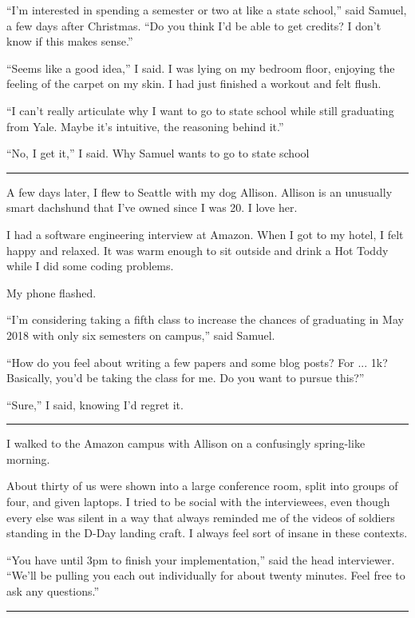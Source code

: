 ``I'm interested in spending a semester or two at like a state school,'' said
Samuel, a few days after Christmas.  ``Do you think I'd be able to get credits?
I don't know if this makes sense.''

``Seems like a good idea,'' I said.  I was lying on my bedroom floor, enjoying
the feeling of the carpet on my skin.  I had just finished a workout and felt
flush.

``I can't really articulate why I want to go to state school while still
graduating from Yale.   Maybe it's intuitive, the reasoning behind it.'' 

``No, I get it,'' I said.  Why Samuel wants to go to state school

\plainfancybreak{12pt}{2}{* * *}

A few days later, I flew to Seattle with my dog Allison.  Allison is an
unusually smart dachshund that I've owned since I was 20.  I love her.  

I had a software engineering interview at Amazon.  When I got to my hotel, I
felt happy and relaxed. It was warm enough to sit outside and drink a Hot Toddy
while I did some coding problems. 

My phone flashed.

``I'm considering taking a fifth class to increase the chances of graduating in
May 2018 with only six semesters on campus,'' said Samuel.  

``How do you feel about writing a few papers and some blog posts?  For ... 1k?
Basically, you'd be taking the class for me.  Do you want to pursue this?'' 

``Sure,'' I said, knowing I'd regret it.

\plainfancybreak{12pt}{2}{* * *}

I walked to the Amazon campus with Allison on a confusingly spring-like morning. 

About thirty of us were shown into a large conference room, split into groups of
four, and given laptops.  I tried to be social with the interviewees, even
though every else was silent in a way that always reminded me of the videos of
soldiers standing in the D-Day landing craft.  I always feel sort of insane in these
contexts.

``You have until 3pm to finish your implementation,'' said the head interviewer.
``We'll be pulling you each out individually for about twenty minutes.  Feel
free to ask any questions.''

\plainfancybreak{12pt}{2}{* * *}

